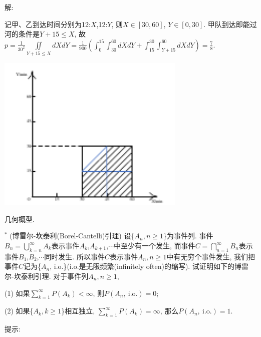 \documentclass[standard]{ExBook}
\begin{document}
\begin{qitems}
\vspace{-5em}

    \begin{bbox}
解: 

记甲、乙到达时间分别为12:$X$,12:$Y$, 则$X\in[30,60]$, $Y\in[0,30]$. 甲队到达即能过河的条件是$Y+15 \leq X$, 故$p=\frac{1}{30^2}\iint\limits_{Y+15 \leq X}dXdY=\frac{1}{900}(\int_{0}^{15}\int_{30}^{60}dXdY+\int_{15}^{30}\int_{Y+15}^{60}dXdY)=\frac{7}{8}$.

\begin{minipage}{9cm}
    \centering
    \includegraphics[width=9cm]{img/1.18.pdf}
\end{minipage}

\textcolor{themeColor}{\selectfont {} 几何概型.}
    \end{bbox}

\vspace{-5em}

    \begin{bbox}
    \begin{shaded}
        \qitem$^*$
(博雷尔-坎泰利(Borel-Cantelli)引理) 设\{$A_n,n \geq 1$\}为事件列. 事件$B_{n}=\bigcup\limits_{k=n}^{\infty}A_{k}$表示事件$A_{k}$,$A_{k+1}$,$\cdots$中至少有一个发生, 而事件$C=\bigcap\limits_{n=1}^{\infty}B_{n}$表示事件$B_{1}$,$B_{2}$,$\cdots$同时发生. 所以事件$C$表示事件$A_{n},n \geq 1$中有无穷个事件发生, 我们把事件$C$记为\{$A_{n}$, i.o.\}(i.o.是无限频繁(infinitely often)的缩写). 试证明如下的博雷尔-坎泰利引理. 对于事件列$A_{n},n \geq 1$,

(1) 如果$\sum\limits_{k=1}^{\infty}P(A_{k})<\infty$, 则$P(A_{n},\ \text{i.o.})=0$;

(2) 如果\{$A_{k},k \geq 1$\}相互独立, $\sum\limits_{k=1}^{\infty}P(A_{k})=\infty$, 那么$P(A_{n},\ \text{i.o.})=1$.

提示:


\end{shaded}
\end{bbox}
\end{qitems}
\end{document}
